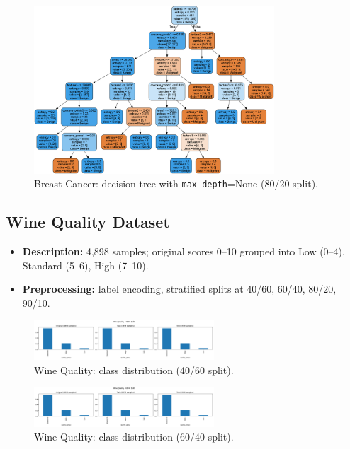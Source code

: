 \begin{figure}[H]
	\centering
	\includegraphics[width=0.8\textwidth]{imgs/dt/dt__breast_cancer__80_vs_20__None.png}
	\caption{Breast Cancer: decision tree with \texttt{max\_depth}=None (80/20 split).}
	\label{fig:bc-dt-depth-none}
\end{figure}

\clearpage

\subsection{Wine Quality Dataset}
\begin{itemize}
	\item \textbf{Description:} 4,898 samples; original scores 0–10 grouped into Low (0–4), Standard (5–6), High (7–10).
	\item \textbf{Preprocessing:} label encoding, stratified splits at 40/60, 60/40, 80/20, 90/10.
\end{itemize}

\begin{figure}[H]
	\centering
	\includegraphics[width=0.6\textwidth]{imgs/class_dist/class_dist__wine_quality__40_vs_60.png}
	\caption{Wine Quality: class distribution (40/60 split).}
	\label{fig:wq-cd-40-60}
\end{figure}

\begin{figure}[H]
	\centering
	\includegraphics[width=0.6\textwidth]{imgs/class_dist/class_dist__wine_quality__60_vs_40.png}
	\caption{Wine Quality: class distribution (60/40 split).}
	\label{fig:wq-cd-60-40}
\end{figure}

